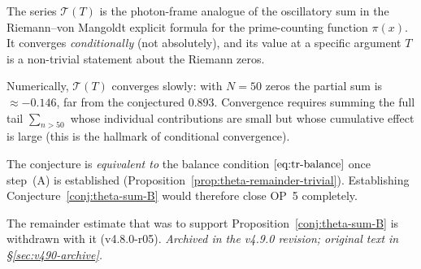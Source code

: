 \begin{remark}
\label{rem:theta-sum-structure}
The series $\mathcal{T}(T)$ is the photon-frame analogue of the
oscillatory sum in the Riemann--von Mangoldt explicit formula for
the prime-counting function $\pi(x)$. It converges \emph{conditionally}
(not absolutely), and its value at a specific argument $T$ is a
non-trivial statement about the Riemann zeros.

Numerically, $\mathcal{T}(T)$ converges slowly: with $N=50$ zeros
the partial sum is $\approx -0.146$, far from the conjectured $0.893$.
Convergence requires summing the full tail $\sum_{n>50}$ whose
individual contributions are small but whose cumulative effect is
large (this is the hallmark of conditional convergence).

The conjecture is \emph{equivalent to} the balance condition
$\eqref{eq:tr-balance}$ once step~(A) is established
(Proposition~\ref{prop:theta-remainder-trivial}). Establishing
Conjecture~\ref{conj:theta-sum-B} would therefore close OP~5
completely.
\end{remark}


\begin{remark}\label{rem:explicit-formula-remainder}
The remainder estimate that was to support Proposition~\ref{conj:theta-sum-B} is withdrawn with it (v4.8.0-r05).
\emph{Archived in the v4.9.0 revision; original text in \S\ref{sec:v490-archive}.}
\end{remark}



